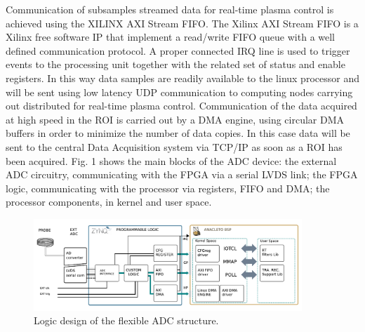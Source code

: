 Communication of subsamples streamed data for real-time plasma control is achieved using the XILINX AXI Stream FIFO. The Xilinx AXI Stream FIFO is a Xilinx free software IP that implement a read/write FIFO queue with a well defined communication protocol. A proper connected IRQ line is used to trigger events to the processing unit together with the related set of status and enable registers. In this way data samples are readily available to the linux processor and will be sent using low latency UDP communication to computing nodes carrying out distributed for real-time plasma control. Communication of the data acquired at high speed in the ROI is carried out by a DMA engine, using circular DMA buffers in order to minimize the number of data copies. In this case data will be sent to the central Data Acquisition system via TCP/IP as soon as a ROI has been acquired. Fig. 1 shows the main blocks of the ADC device: the external ADC circuitry, communicating with the FPGA via a serial LVDS link; the FPGA logic, communicating with the processor via registers, FIFO and DMA; the processor components, in kernel and user space. 
~
~
\begin{figure}[ht]
\centering
\includegraphics[width=0.9\textwidth]{img/4_EmbeddedML/schema_logico.pdf}
\caption{Logic design of the flexible ADC structure.}
\label{fig:logic}
\end{figure}





